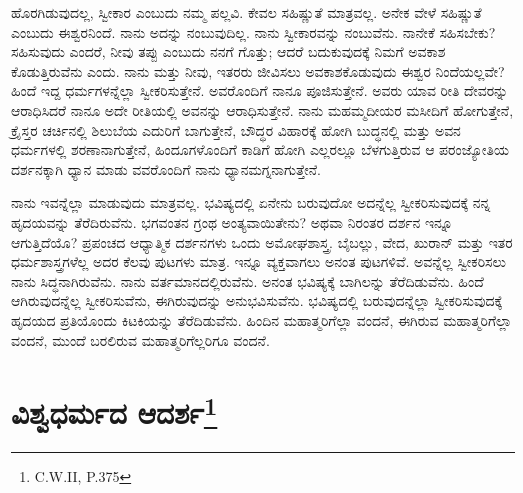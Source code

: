 ಹೊರಗಿಡುವುದಲ್ಲ, ಸ್ವೀಕಾರ ಎಂಬುದು ನಮ್ಮ ಪಲ್ಲವಿ. ಕೇವಲ ಸಹಿಷ್ಣುತೆ ಮಾತ್ರವಲ್ಲ. ಅನೇಕ ವೇಳೆ ಸಹಿಷ್ಣುತೆ ಎಂಬುದು ಈಶ್ವರನಿಂದೆ. ನಾನು ಅದನ್ನು ನಂಬುವುದಿಲ್ಲ. ನಾನು ಸ್ವೀಕಾರವನ್ನು ನಂಬುವೆನು. ನಾನೇಕೆ ಸಹಿಸಬೇಕು? ಸಹಿಸುವುದು ಎಂದರೆ, ನೀವು ತಪ್ಪು ಎಂಬುದು ನನಗೆ ಗೊತ್ತು; ಆದರೆ ಬದುಕುವುದಕ್ಕೆ ನಿಮಗೆ ಅವಕಾಶ ಕೊಡುತ್ತಿರುವೆನು ಎಂದು. ನಾನು ಮತ್ತು ನೀವು, ಇತರರು ಜೀವಿಸಲು ಅವಕಾಶಕೊಡುವುದು ಈಶ್ವರ ನಿಂದೆಯಲ್ಲವೇ? ಹಿಂದೆ ಇದ್ದ ಧರ್ಮಗಳನ್ನೆಲ್ಲಾ ಸ್ವೀಕರಿಸುತ್ತೇನೆ. ಅವರೊಂದಿಗೆ ನಾನೂ ಪೂಜಿಸುತ್ತೇನೆ. ಅವರು ಯಾವ ರೀತಿ ದೇವರನ್ನು ಆರಾಧಿಸಿದರೆ ನಾನೂ ಅದೇ ರೀತಿಯಲ್ಲಿ ಅವನನ್ನು ಆರಾಧಿಸುತ್ತೇನೆ. ನಾನು ಮಹಮ್ಮದೀಯರ ಮಸೀದಿಗೆ ಹೋಗುತ್ತೇನೆ, ಕ್ರೈಸ್ತರ ಚರ್ಚಿನಲ್ಲಿ ಶಿಲುಬೆಯ ಎದುರಿಗೆ ಬಾಗುತ್ತೇನೆ, ಬೌದ್ಧರ ವಿಹಾರಕ್ಕೆ ಹೋಗಿ ಬುದ್ಧನಲ್ಲಿ ಮತ್ತು ಅವನ ಧರ್ಮಗಳಲ್ಲಿ ಶರಣಾನಾಗುತ್ತೇನೆ, ಹಿಂದೂಗಳೊಂದಿಗೆ ಕಾಡಿಗೆ ಹೋಗಿ ಎಲ್ಲರಲ್ಲೂ ಬೆಳಗುತ್ತಿರುವ ಆ ಪರಂಜ್ಯೋತಿಯ ದರ್ಶನಕ್ಕಾಗಿ ಧ್ಯಾನ ಮಾಡು ವವರೊಂದಿಗೆ ನಾನು ಧ್ಯಾನಮಗ್ನನಾಗುತ್ತೇನೆ.

\newpage

ನಾನು ಇವನ್ನೆಲ್ಲಾ ಮಾಡುವುದು ಮಾತ್ರವಲ್ಲ. ಭವಿಷ್ಯದಲ್ಲಿ ಏನೇನು ಬರುವುದೋ ಅದನ್ನೆಲ್ಲ ಸ್ವೀಕರಿಸುವುದಕ್ಕೆ ನನ್ನ ಹೃದಯವನ್ನು ತೆರೆದಿರುವೆನು. ಭಗವಂತನ ಗ್ರಂಥ ಅಂತ್ಯವಾಯಿತೇನು? ಅಥವಾ ನಿರಂತರ ದರ್ಶನ ಇನ್ನೂ ಆಗುತ್ತಿದೆಯೊ? ಪ್ರಪಂಚದ ಆಧ್ಯಾತ್ಮಿಕ ದರ್ಶನಗಳು ಒಂದು ಅಮೋಘಶಾಸ್ತ್ರ. ಬೈಬಲ್ಲು, ವೇದ, ಖುರಾನ್​ ಮತ್ತು ಇತರ ಧರ್ಮಶಾಸ್ತ್ರಗಳೆಲ್ಲ ಅದರ ಕೆಲವು ಪುಟಗಳು ಮಾತ್ರ. ಇನ್ನೂ ವ್ಯಕ್ತವಾಗಲು ಅನಂತ ಪುಟಗಳಿವೆ. ಅವನ್ನೆಲ್ಲ ಸ್ವೀಕರಿಸಲು ನಾನು ಸಿದ್ಧನಾಗಿರುವೆನು. ನಾನು ವರ್ತಮಾನದಲ್ಲಿರುವೆನು. ಅನಂತ ಭವಿಷ್ಯಕ್ಕೆ ಬಾಗಿಲನ್ನು ತೆರೆದಿಡುವೆನು. ಹಿಂದೆ ಆಗಿರುವುದನ್ನೆಲ್ಲ ಸ್ವೀಕರಿಸುವೆನು, ಈಗಿರುವುದನ್ನು ಅನುಭವಿಸುವೆನು. ಭವಿಷ್ಯದಲ್ಲಿ ಬರುವುದನ್ನೆಲ್ಲಾ ಸ್ವೀಕರಿಸುವುದಕ್ಕೆ ಹೃದಯದ ಪ್ರತಿಯೊಂದು ಕಿಟಕಿಯನ್ನು ತೆರೆದಿಡುವೆನು. ಹಿಂದಿನ ಮಹಾತ್ಮರಿಗೆಲ್ಲಾ ವಂದನೆ, ಈಗಿರುವ ಮಹಾತ್ಮರಿಗೆಲ್ಲಾ ವಂದನೆ, ಮುಂದೆ ಬರಲಿರುವ ಮಹಾತ್ಮರಿಗೆಲ್ಲರಿಗೂ ವಂದನೆ.

\chapter[ವಿಶ್ವಧರ್ಮದ ಆದರ್ಶ]{ವಿಶ್ವಧರ್ಮದ ಆದರ್ಶ\protect\footnote{C.W.II, P.375}}%


